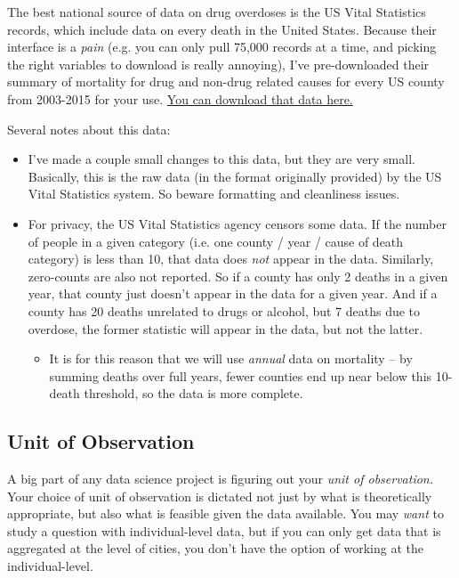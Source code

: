 \documentclass[12pt]{article}
\begin{document}
The best national source of data on drug overdoses is the US Vital Statistics records, which include data on every death in the United States. Because their interface is a \emph{pain} (e.g. you can only pull 75,000 records at a time, and picking the right variables to download is really annoying), I've pre-downloaded their summary of mortality for drug and non-drug related causes for every US county from 2003-2015 for your use. \href{https://www.dropbox.com/s/kad4dwebr88l3ud/US_VitalStatistics.zip?dl=0}{You can download that data here.}

Several notes about this data:
\begin{itemize}
  \item I've made a couple small changes to this data, but they are very small. Basically, this is the raw data (in the format originally provided) by the US Vital Statistics system. So beware formatting and cleanliness issues.
  \item For privacy, the US Vital Statistics agency censors some data. If the number of people in a given category (i.e. one county / year / cause of death category) is less than 10, that data does \emph{not} appear in the data. Similarly, zero-counts are also not reported. So if a county has only 2 deaths in a given year, that county just doesn't appear in the data for a given year. And if a county has 20 deaths unrelated to drugs or alcohol, but 7 deaths due to overdose, the former statistic will appear in the data, but not the latter.
  \begin{itemize}
    \item It is for this reason that we will use \emph{annual} data on mortality -- by summing deaths over full years, fewer counties end up near below this 10-death threshold, so the data is more complete.
  \end{itemize}
\end{itemize}


\subsection*{Unit of Observation}

A big part of any data science project is figuring out your \emph{unit of observation.} Your choice of unit of observation is dictated not just by what is theoretically appropriate, but also what is feasible given the data available. You may \emph{want} to study a question with individual-level data, but if you can only get data that is aggregated at the level of cities, you don't have the option of working at the individual-level.
\end{document}
